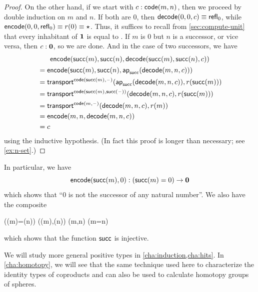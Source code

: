 \begin{proof}
  On the other hand, if we start with $c:\mathsf{code}(m,n)$, then we proceed by double induction on $m$ and $n$.
  If both are $0$, then $\mathsf{decode}(0,0,c) \equiv \mathsf{refl}_{0}$, while $\mathsf{encode}(0,0,\mathsf{refl}_{0})\equiv r(0) \equiv \star$.
  Thus, it suffices to recall from \cref{sec:compute-unit} that every inhabitant of $\mathbf{1}$ is equal to \ttt.
  If $m$ is $0$ but $n$ is a successor, or vice versa, then $c:\mathbf{0}$, so we are done.
  And in the case of two successors, we have
  \begin{multline*}
    \mathsf{encode}(\mathsf{succ}(m),\mathsf{succ}(n),\mathsf{decode}(\mathsf{succ}(m),\mathsf{succ}(n),c))\\
    \begin{aligned}
    &= \mathsf{encode}(\mathsf{succ}(m),\mathsf{succ}(n),\mathsf{ap}_{\mathsf{succ}}(\mathsf{decode}(m,n,c)))\\
    &= \mathsf{transport}^{\mathsf{code}(\mathsf{succ}(m),{\mathord{\hspace{1pt}\text{--}\hspace{1pt}}})}(\mathsf{ap}_{\mathsf{succ}}(\mathsf{decode}(m,n,c)),r(\mathsf{succ}(m)))\\
    &= \mathsf{transport}^{\mathsf{code}(\mathsf{succ}(m),\mathsf{succ}({\mathord{\hspace{1pt}\text{--}\hspace{1pt}}}))}(\mathsf{decode}(m,n,c),r(\mathsf{succ}(m)))\\
    &= \mathsf{transport}^{\mathsf{code}(m,{\mathord{\hspace{1pt}\text{--}\hspace{1pt}}})}(\mathsf{decode}(m,n,c),r(m))\\
    &= \mathsf{encode}(m,n,\mathsf{decode}(m,n,c))\\
    &= c
  \end{aligned}
  \end{multline*}
  using the inductive hypothesis.
  (In fact this proof is longer than necessary; see \cref{ex:n-set}.)
\end{proof}

In particular, we have
\begin{equation}\label{eq:zero-not-succ}
  \encode(\suc(m),0) : (\suc(m)=0) \to \emptyt
\end{equation}
which shows that ``$0$ is not the successor of any natural number''.
We also have the composite
\begin{narrowmultline}\label{eq:suc-injective}
  (\suc(m)=\suc(n))
  \xrightarrow{\encode} \narrowbreak
  \code(\suc(m),\suc(n))
  \jdeq \code(m,n) \xrightarrow{\decode} (m=n)
\end{narrowmultline}
which shows that the function $\mathsf{succ}$ is injective.
%

We will study more general positive types in \cref{cha:induction,cha:hits}.
In \cref{cha:homotopy}, we will see that the same technique used here to characterize the identity types of coproducts and \nat can also be used to calculate homotopy groups of spheres.

%
%

